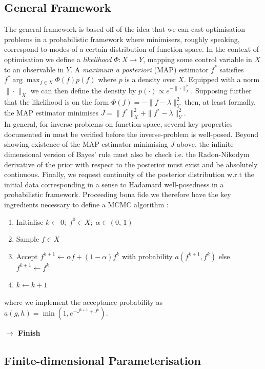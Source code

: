 \documentclass[runningheads]{llncs}
\begin{document}
\subsection{General Framework}\label{subs:gf}

The general framework is based off of the idea that we can cast optimisation
problems in a probabilistic framework where minimisers, roughly speaking,
correspond to modes of a certain distribution of function space.  In the context
of optimisation we define a \emph{likelihood} $\Phi : X\rightarrow Y$, mapping
some control variable in $X$ to an observable in $Y$.  A \emph{maximum a
posteriori} (MAP) estimator $f^*$ satisfies $f^* \arg\max_{f\in X} \Phi(f) p(f)$
where $p$ is a density over $X$. Equipped with a norm $\|\cdot\|_X$ we can then
define the density by $p(\cdot) \propto e^{-\|\cdot\|_X^2}$.  Supposing further
that the likelihood is on the form $\Phi(f) = -\|f-\lambda\|_Y^2$ then, at least
formally, the MAP estimator minimises $J =\|f^*\|_X^2 + \|f^*-\lambda\|_Y^2$.\\

In general, for inverse problems on function space, several key properties
documented in \cite{?} must be verified before the inverse-problem is
well-posed. Beyond showing existence of the MAP estimator minimising $J$ above,
the infinite-dimensional version of Bayes' rule must also be check i.e. the
Radon-Nikodym derivative of the prior with respect to the posterior must exist
and be absolutely continuous. Finally, we request continuity of the posterior
distribution w.r.t the initial data corresponding in a sense to Hadamard
well-posedness in a probabilistic framework. Proceeding bona fide we therefore
have the key ingredients necessary to define a MCMC algorithm
\cite{cotter2013mcmc}:
\begin{enumerate}
\item Initialise $k \gets 0;\; f^0 \in X;\; \alpha \in (0,\,1)$ 
\item Sample $f\in X$
\item Accept $f^{k+1} \gets \alpha f + (1-\alpha) f^k$ with probability
$a(f^{k+1}, f^k)$ else $f^{k+1} \gets f^k$
\item $k \gets k + 1$
\end{enumerate}
where we implement the acceptance probability as $a(g,h) = \min(1, e^{-J^{k+1} +
J^k})$.

\textbf{$\longrightarrow$ Finish}\\

\subsection{Finite-dimensional Parameterisation}\label{subs:finite-dim-param}
\end{document}
